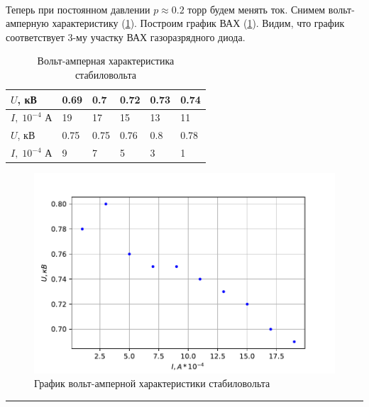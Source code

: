\documentclass[a4paper,12pt]{article} %
\begin{document}
\paragraph{} Теперь при постоянном давлении $p \approx 0.2$ торр будем менять ток. Снимем вольт-амперную характеристику (\ref{tab:vac}). Построим график ВАХ (\ref{fig:afc}). Видим, что график соответствует 3-му участку ВАХ газоразрядного диода.

\begin{table}[h]
\centering
\begin{tabular}{|l|l|l|l|l|l|}
\hline
$U$, кВ           & 0.69 & 0.7  & 0.72 & 0.73 & 0.74 \\ \hline
$I, \; 10^{-4}$ А & 19   & 17   & 15   & 13   & 11   \\ \hline
$U$, кВ           & 0.75 & 0.75 & 0.76 & 0.8  & 0.78 \\ \hline
$I, \; 10^{-4}$ А & 9    & 7    & 5    & 3    & 1    \\ \hline
\end{tabular}
\caption{Вольт-амперная характеристика стабиловольта}
\label{tab:vac}
\end{table}

\begin{figure}[h]
\centering
\includegraphics[width=\textwidth]{vah.pdf}
\caption{График вольт-амперной характеристики стабиловольта}
\label{fig:afc}
\end{figure}




\medskip\hrule\medskip
\end{document}

